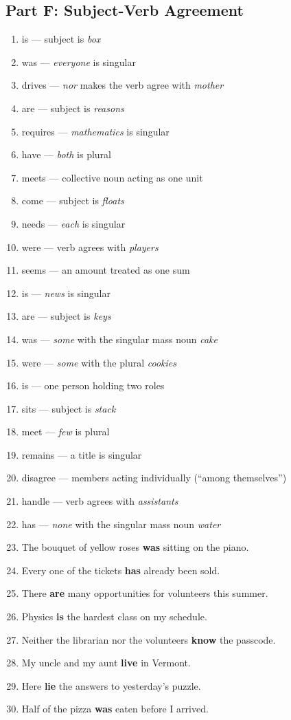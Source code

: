 \documentclass[11pt]{article}
\begin{document}
\subsection*{Part F: Subject-Verb Agreement}
\begin{enumerate}
  \item is --- subject is \textit{box}
  \item was --- \textit{everyone} is singular
  \item drives --- \textit{nor} makes the verb agree with \textit{mother}
  \item are --- subject is \textit{reasons}
  \item requires --- \textit{mathematics} is singular
  \item have --- \textit{both} is plural
  \item meets --- collective noun acting as one unit
  \item come --- subject is \textit{floats}
  \item needs --- \textit{each} is singular
  \item were --- verb agrees with \textit{players}
  \item seems --- an amount treated as one sum
  \item is --- \textit{news} is singular
  \item are --- subject is \textit{keys}
  \item was --- \textit{some} with the singular mass noun \textit{cake}
  \item were --- \textit{some} with the plural \textit{cookies}
  \item is --- one person holding two roles
  \item sits --- subject is \textit{stack}
  \item meet --- \textit{few} is plural
  \item remains --- a title is singular
  \item disagree --- members acting individually (``among themselves'')
  \item handle --- verb agrees with \textit{assistants}
  \item has --- \textit{none} with the singular mass noun \textit{water}
  \item The bouquet of yellow roses \textbf{was} sitting on the piano.
  \item Every one of the tickets \textbf{has} already been sold.
  \item There \textbf{are} many opportunities for volunteers this summer.
  \item Physics \textbf{is} the hardest class on my schedule.
  \item Neither the librarian nor the volunteers \textbf{know} the passcode.
  \item My uncle and my aunt \textbf{live} in Vermont.
  \item Here \textbf{lie} the answers to yesterday's puzzle.
  \item Half of the pizza \textbf{was} eaten before I arrived.
\end{enumerate}
\end{document}
